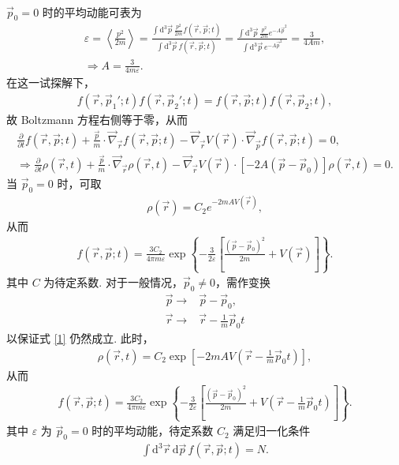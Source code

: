 \documentclass{assignment}
\begin{document}
\begin{sol}
\begin{align}
    \end{align}
    $\vec{p}_0=0$ 时的平均动能可表为
    \begin{gather}
        \varepsilon=\left\langle\frac{p^2}{2m}\right\rangle=\frac{\int\mathrm{d}^3\vec{p}\,\frac{p^2}{2m}f(\vec{r},\vec{p};t)}{\int\mathrm{d}^3\vec{p}\,f(\vec{r},\vec{p};t)}=\frac{\int\mathrm{d}^3\vec{p}\,\frac{p^2}{2m}e^{-A\vec{p}^2}}{\int\mathrm{d}^3\vec{p}\,e^{-A\vec{p}^2}}=\frac{3}{4Am},\\
        \Longrightarrow A=\frac{3}{4m\varepsilon}.
    \end{gather}
    在这一试探解下，
    \begin{align}
        f(\vec{r},\vec{p}_1';t)f(\vec{r},\vec{p}_2';t)=f(\vec{r},\vec{p};t)f(\vec{r},\vec{p}_2;t),
    \end{align}
    故 Boltzmann 方程右侧等于零，从而
    \begin{gather}
        \frac{\partial}{\partial t}f(\vec{r},\vec{p};t)+\frac{\vec{p}}{m}\cdot\vec{\nabla}_{\vec{r}}f(\vec{r},\vec{p};t)-\vec{\nabla}_{\vec{r}}V(\vec{r})\cdot\vec{\nabla}_{\vec{p}}f(\vec{r},\vec{p};t)=0,\\
        \label{1}\Longrightarrow\frac{\partial}{\partial t}\rho(\vec{r},t)+\frac{\vec{p}}{m}\cdot\vec{\nabla}_{\vec{r}}\rho(\vec{r},t)-\vec{\nabla}_{\vec{r}}V(\vec{r})\cdot\left[-2A(\vec{p}-\vec{p}_0)\right]\rho(\vec{r},t)=0.
    \end{gather}
    当 $\vec{p}_0=0$ 时，可取
    \begin{align}
        \rho(\vec{r})=C_2e^{-2mAV(\vec{r})},
    \end{align}
    从而
    \begin{align}
        f(\vec{r},\vec{p};t)=\frac{3C_2}{4\pi m\varepsilon}\exp\left\{-\frac{3}{2\varepsilon}\left[\frac{(\vec{p}-\vec{p}_0)^2}{2m}+V(\vec{r})\right]\right\}.
    \end{align}
    其中 $C$ 为待定系数.
    对于一般情况，$\vec{p}_0\neq 0$，需作变换
    \begin{align}
        \vec{p}\rightarrow&\vec{p}-\vec{p}_0,\\
        \vec{r}\rightarrow&\vec{r}-\frac{1}{m}\vec{p}_0t
    \end{align}
    以保证式 \eqref{1} 仍然成立.
    此时，
    \begin{align}
        \rho(\vec{r},t)=C_2\exp\left[-2mAV\left(\vec{r}-\frac{1}{m}\vec{p}_0t\right)\right],
    \end{align}
    从而
    \begin{align}
        f(\vec{r},\vec{p};t)=\frac{3C_2}{4\pi m\varepsilon}\exp\left\{-\frac{3}{2\varepsilon}\left[\frac{(\vec{p}-\vec{p}_0)^2}{2m}+V\left(\vec{r}-\frac{1}{m}\vec{p}_0t\right)\right]\right\}.
    \end{align}
    其中 $\varepsilon$ 为 $\vec{p}_0=0$ 时的平均动能，待定系数 $C_2$ 满足归一化条件
    \begin{align}
        \int\mathrm{d}^3\vec{r}\,\mathrm{d}\vec{p}\,f(\vec{r},\vec{p};t)=N.
    \end{align}
\end{sol}
\end{document}
